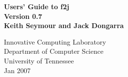 \thispagestyle{empty}
\begin{center}
\huge
\bf
Users' Guide to f2j \\
Version 0.7
\vspace*{1in} \mbox{} \\
\LARGE \rm
Keith Seymour and Jack Dongarra 

\vspace*{.5in}
Innovative Computing Laboratory\\
Department of Computer Science\\
University of Tennessee\\
\vspace*{.5in}
Jan 2007
\end{center}

